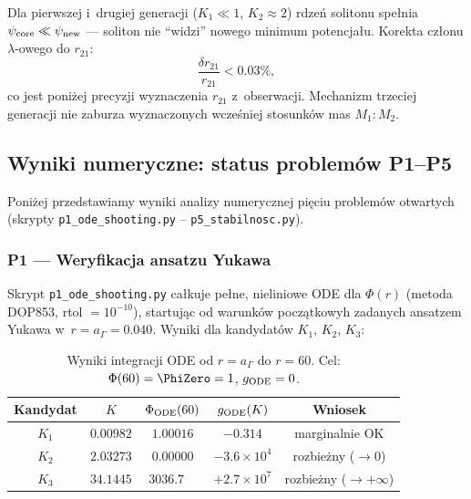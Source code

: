 \begin{proposition}%
\label{prop:wplyw-lambda}
Dla pierwszej i~drugiej generacji ($K_1 \ll 1$, $K_2 \approx 2$)
rdzeń solitonu spełnia $\psi_{\rm core} \ll \psi_{\rm new}$
— soliton nie ``widzi'' nowego minimum potencjału.
Korekta członu $\lambda$-owego do $r_{21}$:
\begin{equation}
    \frac{\delta r_{21}}{r_{21}} < 0.03\%,
\end{equation}
co jest poniżej precyzji wyznaczenia $r_{21}$ z~obserwacji.
Mechanizm trzeciej generacji nie zaburza wyznaczonych
wcześniej stosunków mas $M_1:M_2$.
\end{proposition}

\subsection{Wyniki numeryczne: status problemów P1--P5}%
\label{app:I-wyniki-P}

Poniżej przedstawiamy wyniki analizy numerycznej pięciu problemów
otwartych (skrypty \texttt{p1\_ode\_shooting.py} --
\texttt{p5\_stabilnosc.py}).

\subsubsection*{P1 — Weryfikacja ansatzu Yukawa}

Skrypt \texttt{p1\_ode\_shooting.py} całkuje pełne, nieliniowe ODE
dla $\Phi(r)$ (metoda DOP853, rtol $=10^{-10}$), startując od
warunków początkowyh zadanych ansatzem Yukawa w~$r = a_\Gamma = 0.040$.
Wyniki dla kandydatów $K_1$, $K_2$, $K_3$:

\begin{table}[h]
\centering\small
\caption{Wyniki integracji ODE od $r = a_\Gamma$ do $r = 60$.
  Cel: $\Phi(60) = \PhiZero = 1$, $g_{\rm ODE} = 0$.}
\label{tab:p1-wyniki}
\begin{tabular}{@{}ccccc@{}}
\toprule
Kandydat & $K$ & $\Phi_{\rm ODE}(60)$ & $g_{\rm ODE}(K)$ & Wniosek \\
\midrule
$K_1$ & $0.00982$ & $1.00016$ & $-0.314$ & marginalnie OK \\
$K_2$ & $2.03273$ & $0.00000$ & $-3.6\times10^4$ & rozbieżny ($\to 0$) \\
$K_3$ & $34.1445$ & $3036.7\phantom{00}$ & $+2.7\times10^7$ & rozbieżny ($\to +\infty$) \\
\bottomrule
\end{tabular}
\end{table}

